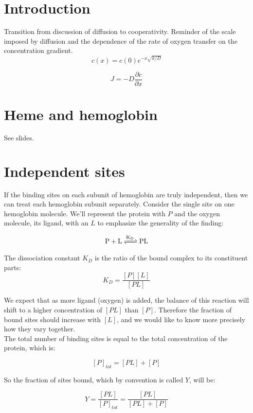 \documentclass{article}
\begin{document}
\large
\section*{Introduction}
Transition from discussion of diffusion to cooperativity. Reminder of the scale imposed by diffusion and the dependence of the rate of oxygen transfer on the concentration gradient.
\[ c(x) = c(0) e^{-x\sqrt{k/D}} \]

\[ J = -D \frac{\partial c}{\partial x} \]

\section*{Heme and hemoglobin}

See slides.

\section*{Independent sites}
If the binding sites on each subunit of hemoglobin are truly independent, then we can treat each hemoglobin subunit separately. Consider the single site on one hemoglobin molecule. We'll represent the protein with $P$ and the oxygen molecule, its ligand, with an $L$ to emphasize the generality of the finding:

\begin{eqnarray*}
\ce{P + L <=>[K_D] PL}
\end{eqnarray*}

The dissociation constant $K_D$ is the ratio of the bound complex to its constituent parts:
\[ K_D = \frac{\left[ P \right]\left[ L \right]}{\left[ PL \right]} \]

We expect that as more ligand (oxygen) is added, the balance of this reaction will shift to a higher concentration of $[PL]$ than $[P]$. Therefore the fraction of bound sites should increase with $[L]$, and we would like to know more precisely how they vary together.\\

The total number of binding sites is equal to the total concentration of the protein, which is:

\[ \left[ P \right]_{tot} = \left[ PL \right] + \left[ P \right] \]

So the fraction of sites bound, which by convention is called $Y$, will be:

\[ Y = \frac{\left[ PL \right]}{\left[ P \right]_{tot}} = \frac{\left[ PL \right]}{\left[ PL \right] + \left[ P \right]} \]
\end{document}

